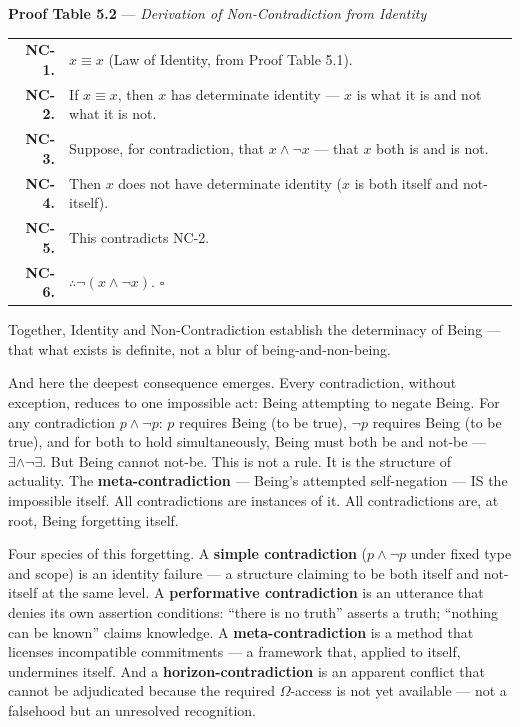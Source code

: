 \documentclass[10pt, openany, oneside]{book}
\renewcommand{\footnotesize}{\fontsize{8.5}{11}\selectfont}
\begin{document}
\vspace{0.5em}

\textbf{Proof Table 5.2} --- \textit{Derivation of Non-Contradiction from Identity}

\vspace{0.5em}

{\footnotesize
\noindent\begin{tabular}{r p{}}
\textbf{NC-1.} & $x \equiv x$ (Law of Identity, from Proof Table 5.1). \\[0.3em]
\textbf{NC-2.} & If $x \equiv x$, then $x$ has determinate identity --- $x$ is what it is and not what it is not. \\[0.3em]
\textbf{NC-3.} & Suppose, for contradiction, that $x \wedge \neg x$ --- that $x$ both is and is not. \\[0.3em]
\textbf{NC-4.} & Then $x$ does not have determinate identity ($x$ is both itself and not-itself). \\[0.3em]
\textbf{NC-5.} & This contradicts NC-2. \\[0.3em]
\textbf{NC-6.} & $\therefore \neg(x \wedge \neg x)$. $\square$ \\[0.3em]
\end{tabular}
}

\vspace{0.8em}

\noindent Together, Identity and Non-Contradiction establish the determinacy of Being --- that what exists is definite, not a blur of being-and-non-being.

And here the deepest consequence emerges. Every contradiction, without exception, reduces to one impossible act: Being attempting to negate Being. For any contradiction $p \wedge \neg p$: $p$ requires Being (to be true), $\neg p$ requires Being (to be true), and for both to hold simultaneously, Being must both be and not-be --- $\exists \wedge \neg\exists$. But Being cannot not-be. This is not a rule. It is the structure of actuality. The \textbf{meta-contradiction} --- Being's attempted self-negation --- IS the impossible itself. All contradictions are instances of it. All contradictions are, at root, Being forgetting itself.

Four species of this forgetting. A \textbf{simple contradiction} ($p \wedge \neg p$ under fixed type and scope) is an identity failure --- a structure claiming to be both itself and not-itself at the same level. A \textbf{performative contradiction} is an utterance that denies its own assertion conditions: ``there is no truth'' asserts a truth; ``nothing can be known'' claims knowledge. A \textbf{meta-contradiction} is a method that licenses incompatible commitments --- a framework that, applied to itself, undermines itself. And a \textbf{horizon-contradiction} is an apparent conflict that cannot be adjudicated because the required $\Omega$-access is not yet available --- not a falsehood but an unresolved recognition.
\end{document}
